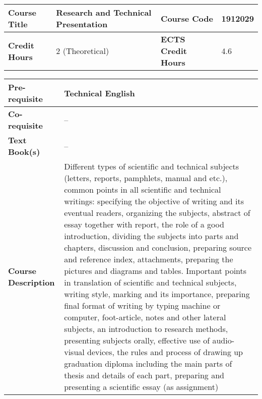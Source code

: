 \documentclass[12pt]{article}
\begin{document}
\begin{minipage}{\textwidth}
\begin{tabularx}{\textwidth}{|l|X|l|X|}
\hline
\textbf{Course Title}       &  Research and Technical Presentation & \textbf{Course Code}       &  1912029 \\ \hline
\textbf{Credit Hours}       &  2 (Theoretical) & \textbf{ECTS Credit Hours}       &   4.6 \\ \hline
\end{tabularx}

\begin{tabularx}{\textwidth}{|l|X|}
\hline
\textbf{Pre-requisite}      &  Technical English \\ \hline
\textbf{Co-requisite}       &  -- \\ \hline
\textbf{Text Book(s)}      & -- \\ \hline
\textbf{Course Description} & \begin{minipage}{.70\textwidth}
					\vspace{3mm}
					Different types of scientific and technical subjects (letters, reports, pamphlets, manual and etc.), 
					common points in all scientific and technical writings: specifying the objective of writing and its
					eventual readers, organizing the subjects, abstract of essay together with report, the role of a good
					introduction, dividing the subjects into parts and chapters, discussion and conclusion, preparing source
					and reference index, attachments, preparing the pictures and diagrams and tables. Important points in
					translation of scientific and technical subjects, writing style, marking and its importance, preparing final
					format of writing by typing machine or computer, foot-article, notes and other lateral subjects, an
					introduction to research methods, presenting subjects orally, effective use of audio-visual devices, the
					rules and process of drawing up graduation diploma including the main parts of thesis and details of
					each part, preparing and presenting a scientific essay (as assignment)

					\vspace{3mm}
					\end{minipage} \\ \hline
\end{tabularx}
\end{minipage}


\bigskip
\bigskip
\end{document}
